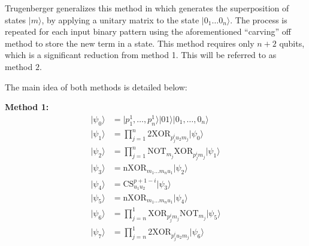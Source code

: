 Trugenberger generalizes this method in \cite{Trugenberger_2002} which generates the superposition of states $\vert m \rangle$, by applying a unitary matrix to the state $\vert 0_1\dots 0_n \rangle$. The process is repeated for each input binary pattern using the aforementioned ``carving'' off method to store the new term in a state. This method requires only $n+2$ qubits, which is a significant reduction from method 1. This will be referred to as method $2$.

The main idea of both methods is detailed below:\\

\noindent
\begin{minipage}[b]{0.45\textwidth}
\textbf{Method 1:}
\begin{align*}{}
\vert \psi_0 \rangle & =  \vert p_1^1,\dots,p_n^1\rangle\vert 01\rangle\vert0_1,\dots,0_n \rangle\\
\vert \psi_1 \rangle & =  \prod\limits_{j=1}^{n} \textrm{2XOR}_{p_j^i u_2 m_j} \vert \psi_0 \rangle\\
\vert \psi_2 \rangle & =  \prod\limits_{j=1}^{n} \textrm{NOT}_{m_j} \textrm{XOR}_{p_j^i m_j}  \vert \psi_1 \rangle\\
\vert \psi_3 \rangle & =  \textrm{nXOR}_{m_1\dots m_n u_1}  \vert \psi_2 \rangle\\
\vert \psi_4 \rangle & =  \textrm{CS}_{u_1 u_2}^{p+1-i}  \vert \psi_3 \rangle\\
\vert \psi_5 \rangle & =  \textrm{nXOR}_{m_1\dots m_n u_1}  \vert \psi_4 \rangle\\
\vert \psi_6 \rangle & =  \prod\limits_{j=n}^{1} \textrm{XOR}_{p_j^i m_j} \textrm{NOT}_{m_j}  \vert \psi_5 \rangle\\
\vert \psi_7 \rangle & =  \prod\limits_{j=n}^{1} 2\textrm{XOR}_{p_j^i u_2 m_j} \vert \psi_6 \rangle
\end{align*}
\hspace{10pt}\\
\hspace{10pt}
\end{minipage}
